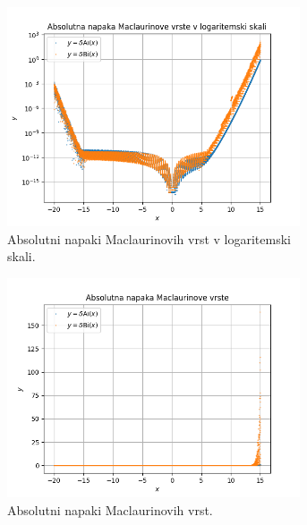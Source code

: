 \documentclass[a4paper, 12pt, slovene]{article}
\begin{document}
\begin{figure}[H]
\begin{subfigure}{0.49\textwidth}
	\includegraphics[width=0.95\textwidth]{grafi/maclaurin_abs_err.png}
	\caption{Absolutni napaki Maclaurinovih vrst v logaritemski skali.}
	\label{fig-mcl-abserr-log}
\end{subfigure}
\begin{subfigure}{0.49\textwidth}
	\centering
	\includegraphics[width=0.95\textwidth]{grafi/maclaurin_abs_err_noscale.png}
	\caption{Absolutni napaki Maclaurinovih vrst.}
	\label{fig-mcl-abserr}
\end{subfigure}
\begin{subfigure}{0.49\textwidth}
	\centering

\end{subfigure}
\end{figure}
\end{document}
